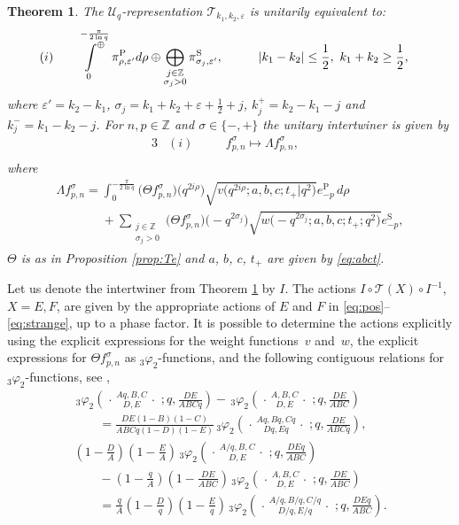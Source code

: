 \documentclass[11pt]{article}
\newtheorem{theorem}{Theorem}
\numberwithin{equation}{section}
\numberwithin{theorem}{section}
\numberwithin{proposition}{section}
\numberwithin{lemma}{section}
\numberwithin{corollary}{section}
\numberwithin{definition}{section}
\numberwithin{example}{section}
\numberwithin{remark}{section}
\numberwithin{note}{section}
\newcommand{\Z}{\mathbb Z}
\newcommand{\eps}{\varepsilon}
\newcommand{\dirint}[2]{\sideset{}{^\oplus}\int\limits_{#1\ }^{\ \ #2}}
\newcommand{\rphis}[5]{\,_{#1}\varphi_{#2} \left( \genfrac{.}{.}{0pt}{}{#3}{#4}
\ ;#5 \right)}
\newcommand{\U}{\mathcal U}
\begin{document}
\begin{theorem} \label{thm:decompT1}
The $\U_q$-representation $\mathcal T_{k_1,k_2,\eps}$ is unitarily equivalent to:
\begin{alignat*}{4}
& (i)\quad && \dirint{0}{-\frac{\pi}{2 \ln q}} \pi^{\mathrm P}_{\rho,\eps'} d\rho \oplus \bigoplus_{\substack{j \in \Z \\ \sigma_j>0}} \pi^{\mathrm S}_{\sigma_j,\eps'},\qquad  &&  |k_1-k_2|\leq \frac12,\ k_1+k_2\geq \frac12,& \\
\end{alignat*}
where $\eps'=k_2-k_1$, $\sigma_j= k_1+k_2+\eps+\frac12+j$, $k_j^+=k_2-k_1-j$ and $k_j^-=k_1-k_2-j$. For $n,p \in \Z$ and $\sigma \in \{-,+\}$ the unitary intertwiner is given by
\begin{alignat*}{3}
& (i)\quad && f_{p,n}^\sigma \mapsto \Lambda f_{p,n}^\sigma,  & \\
\end{alignat*}
where
\begin{gather*}
\Lambda f_{p,n}^\sigma =  \int_0^{-\frac{\pi}{2\ln q}} \big(\Theta f_{p,n}^\sigma\big)\big(q^{2i\rho}\big) \sqrt{v\big(q^{2i\rho};a,b,c;t_+|q^2\big)}  e_{-p}^{\mathrm P}\, d\rho\\
\phantom{\Lambda f_{p,n}^\sigma =}{} + \sum_{\substack{j \in \Z\\\sigma_j>0}} \big(\Theta f_{p,n}^\sigma\big)\big({-}q^{2\sigma_j}\big) \sqrt{w\big({-}q^{2\sigma_j};a,b,c;t_+;q^2\big)} e_{-p}^{\mathrm S},
\end{gather*}
$\Theta$ is as in Proposition {\rm \ref{prop:Te}} and $a$, $b$, $c$, $t_+$ are given by \eqref{eq:abct}.
\end{theorem}
\setcounter{section}{3}
\setcounter{subsection}{0}
\setcounter{subsubsection}{0}
\setcounter{equation}{4}
Let us denote the intertwiner from Theorem \ref{thm:decompT1} by $I$. The actions $I\circ \mathcal T(X)\circ I^{-1}$, $X=E,F$, are given by the appropriate actions of $E$ and $F$ in \eqref{eq:pos}--\eqref{eq:strange}, up to a phase factor. It is possible to determine the actions explicitly using the explicit expressions for the weight functions~$v$ and~$w$, the explicit expressions for $\Theta f_{p,n}^\sigma$ as $_3\varphi_2$-functions, and the following contiguous relations for $_3\varphi_2$-functions, see \cite[(2.3), (2.4)]{GIM96},
\begin{gather*}
\rphis{3}{2}{Aq,B,C}{D,E}{q,\frac{DE}{ABCq}} - \rphis{3}{2}{A,B,C}{D,E}{q,\frac{DE}{ABC}}  \\
\qquad{}=\frac{DE(1-B)(1-C)}{ABCq(1-D)(1-E)} \rphis{3}{2}{Aq,Bq,Cq}{Dq,Eq}{q,\frac{DE}{ABCq}},
\\
\left(1-\frac{D}{A}\right)\left(1-\frac{E}{A}\right) \rphis{3}{2}{A/q,B,C}{D,E}{q,\frac{DEq}{ABC}} \\
\qquad{} -\left(1-\frac{q}{A}\right)\left(1-\frac{DE}{ABC}\right)\rphis{3}{2}{A,B,C}{D,E}{q,\frac{DE}{ABC}}
\\
\qquad{}=\frac{q}{A}\left(1-\frac{D}{q} \right) \left(1-\frac{E}{q} \right)\rphis{3}{2}{A/q,B/q,C/q}{D/q,E/q}{q,\frac{DEq}{ABC}}.
\end{gather*}
\end{document}
